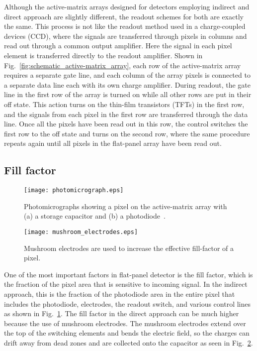 Although the active-matrix arrays designed for detectors employing indirect and direct approach are slightly different, the readout schemes for both are exactly the same.  This process is not like the readout method used in a charge-coupled devices (CCD), where the signals are transferred through pixels in columns and read out through a common output amplifier.  Here the signal in each pixel element is transferred directly to the readout amplifier.  Shown in Fig.~\ref{fig:schematic_active-matrix_array}, each row of the active-matrix array requires a separate gate line, and each column of the array pixels is connected to a separate data line each with its own charge amplifier.  During readout, the gate line in the first row of the array is turned on while all other rows are put in their off state.  This action turns on the thin-film transistors (TFTs) in the first row, and the signals from each pixel in the first row are transferred through the data line.  Once all the pixels have been read out in this row, the control switches the first row to the off state and turns on the second row, where the same procedure repeats again until all pixels in the flat-panel array have been read out.  

\subsection{Fill factor}
%
\begin{figure}[ht]
\texttt{[image: photomicrograph.eps]}
\caption[]{Photomicrographs showing a pixel on the active-matrix array with (a) a storage capacitor and (b) a photodiode\footnotemark~\citep{Rowlands2000}.}
\label{fig:pixel_fill_factor}
\end{figure}
%
\begin{figure}[ht]
\texttt{[image: mushroom\_electrodes.eps]}
\caption{Mushroom electrodes are used to increase the effective fill-factor of a pixel.}
\label{fig:mushroom_electrodes}
\end{figure}

One of the most important factors in flat-panel detector is the fill factor, which is the fraction of the pixel area that is sensitive to incoming signal.  In the indirect approach, this is the fraction of the photodiode area in the entire pixel that includes the photodiode, electrodes, the readout switch, and various control lines as shown in Fig.~\ref{fig:pixel_fill_factor}.  The fill factor in the direct approach can be much higher because the use of mushroom electrodes.  The mushroom electrodes extend over the top of the switching elements and bends the electric field, so the charges can drift away from dead zones and are collected onto the capacitor as seen in Fig.~\ref{fig:mushroom_electrodes}.

